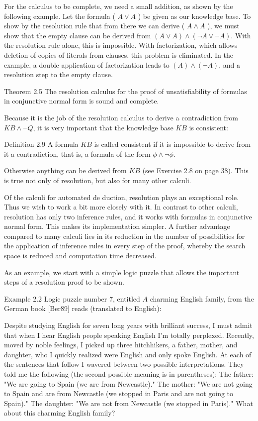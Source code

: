 \documentclass[10pt]{article}
\begin{document}
For the calculus to be complete, we need a small addition, as shown by the following example. Let the formula ( $A \vee A$ ) be given as our knowledge base. To show by the resolution rule that from there we can derive ( $A \wedge A$ ), we must show that the empty clause can be derived from $(A \vee A) \wedge(\neg A \vee \neg A)$. With the resolution rule alone, this is impossible. With factorization, which allows deletion of copies of literals from clauses, this problem is eliminated. In the example, a double application of factorization leads to $(A) \wedge(\neg A)$, and a resolution step to the empty clause.

\begin{displayquote}
Theorem 2.5 The resolution calculus for the proof of unsatisfiability of formulas in conjunctive normal form is sound and complete.
\end{displayquote}

Because it is the job of the resolution calculus to derive a contradiction from $K B \wedge \neg Q$, it is very important that the knowledge base $K B$ is consistent:

Definition 2.9 A formula $K B$ is called consistent if it is impossible to derive from it a contradiction, that is, a formula of the form $\phi \wedge \neg \phi$.

Otherwise anything can be derived from $K B$ (see Exercise 2.8 on page 38). This is true not only of resolution, but also for many other calculi.

Of the calculi for automated de
duction, resolution plays an exceptional role. Thus we wish to work a bit more closely with it. In contrast to other calculi, resolution has only two inference rules, and it works with formulas in conjunctive normal form. This makes its implementation simpler. A further advantage compared to many calculi lies in its reduction in the number of possibilities for the application of inference rules in every step of the proof, whereby the search space is reduced and computation time decreased.

As an example, we start with a simple logic puzzle that allows the important steps of a resolution proof to be shown.

Example 2.2 Logic puzzle number 7, entitled $A$ charming English family, from the German book [Ber89] reads (translated to English):

Despite studying English for seven long years with brilliant success, I must admit that when I hear English people speaking English I'm totally perplexed. Recently, moved by noble feelings, I picked up three hitchhikers, a father, mother, and daughter, who I quickly realized were English and only spoke English. At each of the sentences that follow I wavered between two possible interpretations. They told me the following (the second possible meaning is in parentheses): The father: "We are going to Spain (we are from Newcastle)." The mother: "We are not going to Spain and are from Newcastle (we stopped in Paris and are not going to Spain)." The daughter: "We are not from Newcastle (we stopped in Paris)." What about this charming English family?
\end{document}
